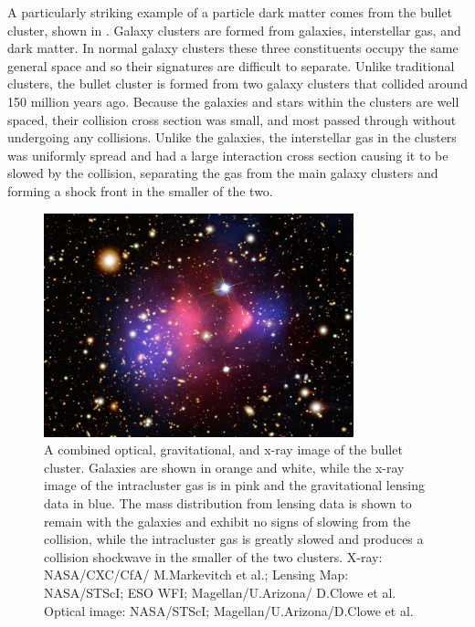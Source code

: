 A particularly striking example of a particle dark matter comes from the bullet cluster, shown in . 
Galaxy clusters are formed from galaxies, interstellar gas, and dark matter.
In normal galaxy clusters these three constituents occupy the same general space and so their signatures are difficult to separate.
Unlike traditional clusters, the bullet cluster is formed from two galaxy clusters that collided around 150 million years ago. 
Because the galaxies and stars within the clusters are well spaced, their collision cross section was small, and most passed through without undergoing any collisions.
Unlike the galaxies, the interstellar gas in the clusters was uniformly spread and had a large interaction cross section causing it to be slowed by the collision, separating the gas from the main galaxy clusters and forming a shock front in the smaller of the two.

\begin{figure}[htpb]
	\label{fig:bullet}
	\centering
	\includegraphics[width=0.8\textwidth]{figures/bullet_cluster.jpg}
	\caption[Visible, x-ray, and gravitational lensing images of the bullet cluster]{ A combined optical, gravitational, and x-ray image of the bullet cluster. Galaxies are shown in orange and white, while the x-ray image of the intracluster gas is in pink and the gravitational lensing data in blue. The mass distribution from lensing data is shown to remain with the galaxies and exhibit no signs of slowing from the collision, while the intracluster gas is greatly slowed and produces a collision shockwave in the smaller of the two clusters. X-ray: NASA/CXC/CfA/ M.Markevitch et al.; Lensing Map: NASA/STScI; ESO WFI; Magellan/U.Arizona/ D.Clowe et al. Optical image: NASA/STScI; Magellan/U.Arizona/D.Clowe et al.}
\end{figure}

